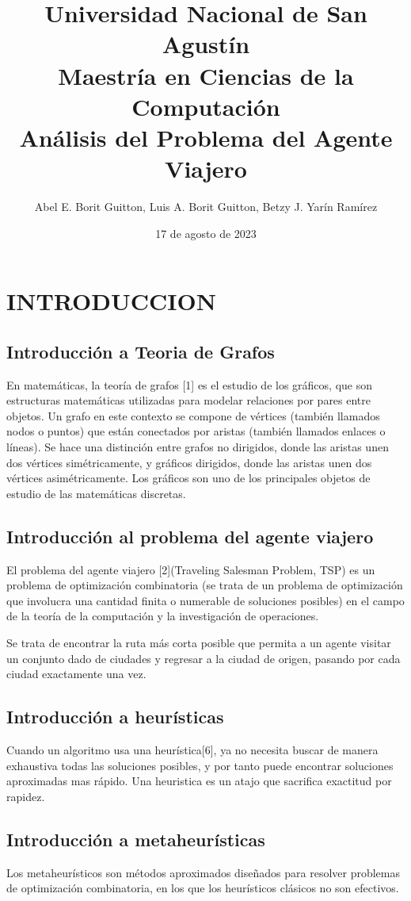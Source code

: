 \documentclass{article}
\title{\textbf{%
    Universidad Nacional de San Agustín \\
    Maestría en Ciencias de la Computación \\
    \large Análisis del Problema del Agente Viajero}}
\author{Abel E. Borit Guitton, Luis A. Borit Guitton, Betzy J. Yarín Ramírez}
\date{17 de agosto de 2023}
\begin{document}
\maketitle

\section{INTRODUCCION}
\subsection{Introducción a Teoria de Grafos}
En matemáticas, la teoría de grafos [1] es el estudio de los gráficos, que son estructuras matemáticas utilizadas para modelar relaciones por pares entre objetos. Un grafo en este contexto se compone de vértices (también llamados nodos o puntos) que están conectados por aristas (también llamados enlaces o líneas). Se hace una distinción entre grafos no dirigidos, donde las aristas unen dos vértices simétricamente, y gráficos dirigidos, donde las aristas unen dos vértices asimétricamente. Los gráficos son uno de los principales objetos de estudio de las matemáticas discretas.

\subsection{Introducción al problema del agente viajero}
El problema del agente viajero [2](Traveling Salesman Problem, TSP) es un problema de optimización combinatoria (se trata de un problema de optimización que involucra una cantidad finita o numerable de soluciones posibles) en el campo de la teoría de la computación y la investigación de operaciones. 

Se trata de encontrar la ruta más corta posible que permita a un agente visitar un conjunto dado de ciudades y regresar a la ciudad de origen, pasando por cada ciudad exactamente una vez.

\subsection{Introducción a heurísticas}
Cuando un algoritmo usa una heurística[6], ya no necesita buscar de manera exhaustiva todas las soluciones posibles, y por tanto puede encontrar soluciones aproximadas mas rápido. Una heuristica es un atajo que sacrifica exactitud por rapidez.

\subsection{Introducción a metaheurísticas}
Los metaheurísticos son métodos aproximados diseñados para resolver problemas de optimización combinatoria, en los que los heurísticos clásicos no son efectivos.
\end{document}
